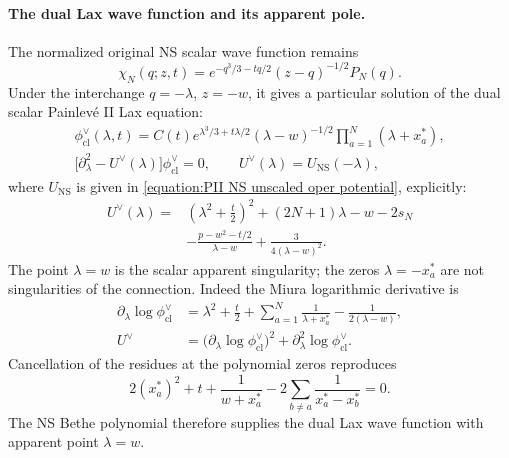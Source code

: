 \documentclass[a4paper,11pt]{article}
\numberwithin{equation}{section}
\begin{document}
\paragraph*{The dual Lax wave function and its apparent pole.}
The normalized original NS scalar wave function remains
\begin{equation}
	\label{equation:PII Langlands NS finite polynomial wave}
	\chi_N(q;z,t)=e^{-q^3/3-tq/2}(z-q)^{-1/2}P_N(q).
\end{equation}
Under the interchange $q=-\lambda$, $z=-w$, it gives a
particular solution of the dual scalar Painlev\'e II Lax equation:
\begin{equation}
	\label{equation:PII Langlands limiting oper correspondence}
	\begin{gathered}
		\phi_{\mathrm{cl}}^{\vee}(\lambda,t)
		=C(t)e^{\lambda^3/3+t\lambda/2}
		(\lambda-w)^{-1/2}\prod_{a=1}^N(\lambda+x_a^*),\\
		\bigl[\partial_{\lambda}^2-U^{\vee}(\lambda)\bigr]\phi_{\mathrm{cl}}^{\vee}=0,
		\qquad U^{\vee}(\lambda)=U_{\mathrm{NS}}(-\lambda),
	\end{gathered}
\end{equation}
where $U_{\mathrm{NS}}$ is given in
\eqref{equation:PII NS unscaled oper potential}, explicitly:
\begin{equation}
	\label{equation:PII Langlands unscaled dual oper explicit}
	\begin{aligned}
		U^{\vee}(\lambda)={}&
		\left(\lambda^2+\frac t2\right)^2+(2N+1)\lambda
		-w-2s_N\\
		&-\frac{p-w^2-t/2}{\lambda-w}
		+\frac{3}{4(\lambda-w)^2}.
	\end{aligned}
\end{equation}
The point $\lambda=w$ is the scalar apparent singularity; the
zeros $\lambda=-x_a^*$ are not singularities of the connection.
Indeed the Miura logarithmic derivative is
\begin{equation}
	\label{equation:PII Langlands Miura factorization}
	\begin{aligned}
		\partial_\lambda\log\phi_{\mathrm{cl}}^{\vee}
		&=\lambda^2+\frac t2+\sum_{a=1}^N\frac{1}{\lambda+x_a^*}
		-\frac{1}{2(\lambda-w)},\\
		U^{\vee}&=\bigl(\partial_\lambda\log\phi_{\mathrm{cl}}^{\vee}\bigr)^2
		+\partial_\lambda^2\log\phi_{\mathrm{cl}}^{\vee}.
	\end{aligned}
\end{equation}
Cancellation of the residues at the polynomial zeros reproduces
\begin{equation}
	\label{equation:PII Langlands reflected finite Bethe equations}
	2(x_a^*)^2+t+\frac{1}{w+x_a^*}
	-2\sum_{b\ne a}\frac{1}{x_a^*-x_b^*}=0.
\end{equation}
The NS Bethe polynomial therefore supplies the dual Lax wave
function with apparent point $\lambda=w$.
\end{document}
